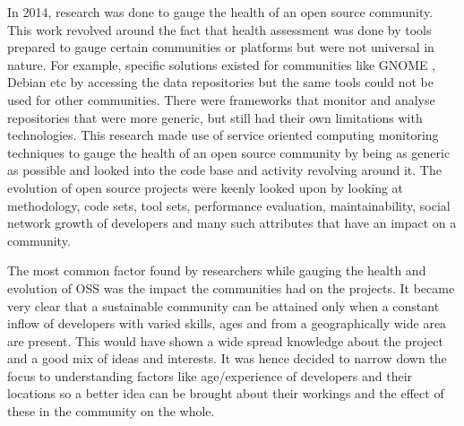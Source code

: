 \documentclass[seploa]{beavtex}
\begin{document}
In 2014, research was done to gauge the health of an open source community. This work revolved around the fact that health assessment was done by tools prepared to gauge certain communities or platforms but were not universal in nature. For example, specific solutions existed for communities like GNOME \cite{gno}, Debian\cite{ver2011} etc by accessing the data repositories but the same tools could not be used for other communities\cite{gno}. There were frameworks that monitor and analyse repositories that were more generic, but still had their own limitations with technologies\cite{marc2014}. This research made use of service oriented computing monitoring techniques to gauge the health of an open source community by being as generic as possible and looked into the code base and activity revolving around it\cite{marc2014}. The evolution of open source projects were keenly looked upon by looking at methodology, code sets, tool sets, performance evaluation, maintainability, social network growth of developers and many such attributes that have an impact on a community\cite{tarja2013}. 

The most common factor found by researchers while gauging the health and evolution of OSS was the impact the communities had on the projects. It became very clear that a sustainable community can be attained only when a constant inflow of developers with varied skills, ages and from a geographically wide area are present. This would have shown a wide spread knowledge about the project and a good mix of ideas and interests. It was hence decided to narrow down the focus to understanding factors like age/experience of developers and their locations so a better idea can be brought about their workings and the effect of these in the community on the whole.
\end{document}
